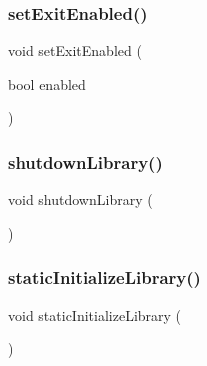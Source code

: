 \subsubsection{\texorpdfstring{set\+Exit\+Enabled()}{setExitEnabled()}}
{\footnotesize\ttfamily void set\+Exit\+Enabled (\begin{DoxyParamCaption}\item[{bool}]{enabled }\end{DoxyParamCaption})}

\mbox{\label{namespacestanfordcpplib_a2937cb1c4385064875d0cb29fcdfeae6}} 
\subsubsection{\texorpdfstring{shutdown\+Library()}{shutdownLibrary()}}
{\footnotesize\ttfamily void shutdown\+Library (\begin{DoxyParamCaption}{ }\end{DoxyParamCaption})}

\mbox{\label{namespacestanfordcpplib_ad5dc96d7e324f70b6bd681ad41abcaa7}} 
\subsubsection{\texorpdfstring{static\+Initialize\+Library()}{staticInitializeLibrary()}}
{\footnotesize\ttfamily void static\+Initialize\+Library (\begin{DoxyParamCaption}{ }\end{DoxyParamCaption})}


